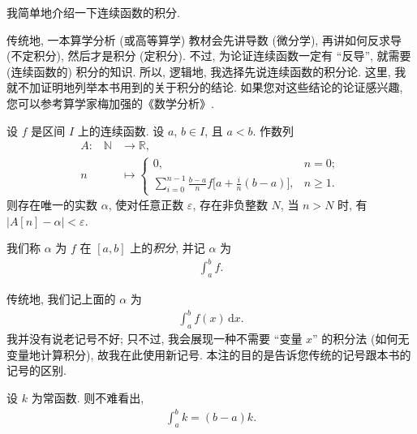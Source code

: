 我简单地介绍一下连续函数的积分.

传统地, 一本算学分析 (或高等算学) 教材会先讲导数 (微分学), 再讲如何反求导 (不定积分), 然后才是积分 (定积分). 不过, 为论证连续函数一定有 ``反导'', 就需要 (连续函数的) 积分的知识. 所以, 逻辑地, 我选择先说连续函数的积分论. 这里, 我就不加证明地列举本书用到的关于积分的结论. 如果您对这些结论的论证感兴趣, 您可以参考算学家梅加强的《数学分析》.

\begin{theorem}
    设 $f$ 是区间 $I$ 上的连续函数. 设 $a$, $b \in I$, 且 $a < b$. 作数列
    \begin{align*}
        \text{$A$:} \quad
        \mathbb{N} & \to \mathbb{R},                                                                                                        \\
        n          & \mapsto \begin{cases}
                                 0,                                                                                             & n = 0;    \\
                                 {\displaystyle \sum_{i = 0}^{n - 1} {\frac{b - a}{n} f\bigg[ a + \frac{i}{n} (b - a) \bigg]}}, & n \geq 1.
                             \end{cases}
    \end{align*}
    则存在唯一的实数 $\alpha$, 使对任意正数 $\varepsilon$, 存在非负整数 $N$, 当 $n > N$ 时, 有 $|A[n] - \alpha| < \varepsilon$.

    我们称 $\alpha$ 为 $f$ 在 $[a, b]$ 上的\emph{积分}, 并记 $\alpha$ 为
    \begin{align*}
        \int_{a}^{b} {f}.
    \end{align*}
\end{theorem}

\begin{remark}
    传统地, 我们记上面的 $\alpha$ 为
    \begin{align*}
        \int_{a}^{b} {f(x) \,\mathrm{d}x}.
    \end{align*}
    我并没有说老记号不好; 只不过, 我会展现一种不需要 ``变量 $x$'' 的积分法 (如何无变量地计算积分), 故我在此使用新记号. 本注的目的是告诉您传统的记号跟本书的记号的区别.
\end{remark}

\begin{example}
    设 $k$ 为常函数. 则不难看出,
    \begin{align*}
        \int_{a}^{b} {k} = (b - a)k.
    \end{align*}
\end{example}

